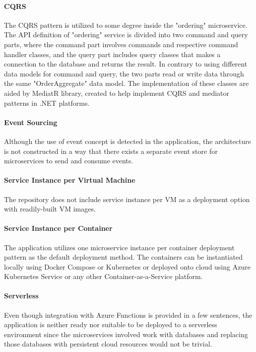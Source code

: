 \documentclass{Configuration_Files/PoliMi3i_thesis}
\begin{document}
\paragraph{CQRS} The CQRS pattern is utilized to some degree inside the "ordering" microservice.
The API definition of "ordering" service is divided into two command and query parts, where the command part involves commands and respective command handler classes, and the query part includes query classes that makes a connection to the database and returns the result.
In contrary to using different data models for command and query, the two parts read or write data through the same "OrderAggregate" data model.
The implementation of these classes are aided by MediatR\footnotemark[68] library, created to help implement CQRS and mediator patterns in .NET platforms.

\paragraph{Event Sourcing} Although the use of event concept is detected in the application, the architecture is not constructed in a way that there exists a separate event store for microservices to send and consume events.

\paragraph{Service Instance per Virtual Machine} The repository does not include service instance per VM as a deployment option with readily-built VM images.

\paragraph{Service Instance per Container} The application utilizes one microservice instance per container deployment pattern as the default deployment method.
The containers can be instantiated locally using Docker Compose or Kubernetes or deployed onto cloud using Azure Kubernetes Service or any other Container-as-a-Service platform.

\paragraph{Serverless} Even though integration with Azure Functions is provided in a few sentences, the application is neither ready nor suitable to be deployed to a serverless environment since the microservices involved work with databases and replacing those databases with persistent cloud resources would not be trivial.
\end{document}
